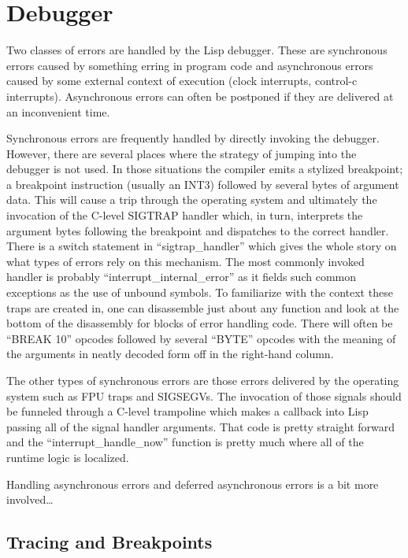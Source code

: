 \chapter{Debugger}
Two classes of errors are handled by the Lisp debugger.  These are
synchronous errors caused by something erring in program code and
asynchronous errors caused by some external context of execution
(clock interrupts, control-c interrupts).  Asynchronous errors can
often be postponed if they are delivered at an inconvenient time.

Synchronous errors are frequently handled by directly invoking the
debugger.  However, there are several places where the strategy of
jumping into the debugger is not used.  In those situations the
compiler emits a stylized breakpoint; a breakpoint instruction
(usually an INT3) followed by several bytes of argument data.  This
will cause a trip through the operating system and ultimately the
invocation of the C-level SIGTRAP handler which, in turn, interprets
the argument bytes following the breakpoint and dispatches to the
correct handler.  There is a switch statement in ``sigtrap\_handler''
which gives the whole story on what types of errors rely on this
mechanism.  The most commonly invoked handler is probably
``interrupt\_internal\_error'' as it fields such common exceptions as
the use of unbound symbols.  To familiarize with the context these
traps are created in, one can disassemble just about any function and
look at the bottom of the disassembly for blocks of error handling code.
There will often be ``BREAK 10'' opcodes followed by several ``BYTE''
opcodes with the meaning of the arguments in neatly decoded form off
in the right-hand column.

The other types of synchronous errors are those errors delivered by
the operating system such as FPU traps and SIGSEGVs.  The invocation
of those signals should be funneled through a C-level trampoline which
makes a callback into Lisp passing all of the signal handler
arguments.  That code is pretty straight forward and the
``interrupt\_handle\_now'' function is pretty much where all of the
runtime logic is localized.

Handling asynchronous errors and deferred asynchronous errors is a bit more
involved\ldots

\section{Tracing and Breakpoints}
\label{sec:trace-and-breakpoints}

